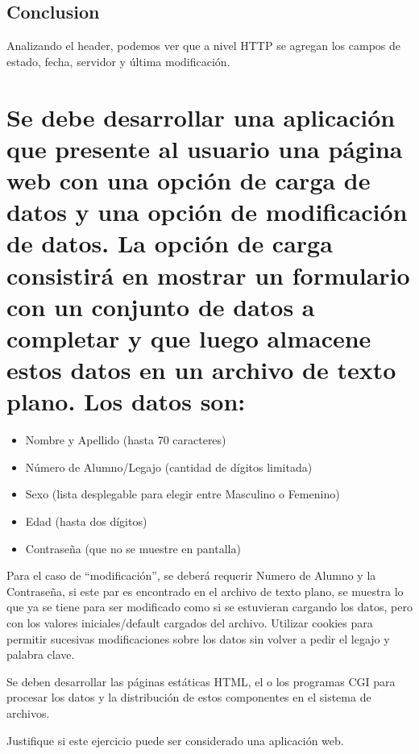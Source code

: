 \documentclass[12pt]{extarticle}
\begin{document}
    \subsection{Conclusion}\label{conclusion}

Analizando el header, podemos ver que a nivel HTTP se agregan los campos
de estado, fecha, servidor y última modificación.

    \section{Se debe desarrollar una aplicación que presente al usuario una
página web con una opción de carga de datos y una opción de modificación
de datos. La opción de carga consistirá en mostrar un formulario con un
conjunto de datos a completar y que luego almacene estos datos en un
archivo de texto plano. Los datos
son:}\label{se-debe-desarrollar-una-aplicaciuxf3n-que-presente-al-usuario-una-puxe1gina-web-con-una-opciuxf3n-de-carga-de-datos-y-una-opciuxf3n-de-modificaciuxf3n-de-datos.-la-opciuxf3n-de-carga-consistiruxe1-en-mostrar-un-formulario-con-un-conjunto-de-datos-a-completar-y-que-luego-almacene-estos-datos-en-un-archivo-de-texto-plano.-los-datos-son}

\begin{itemize}
\item
  Nombre y Apellido (hasta 70 caracteres)
\item
  Número de Alumno/Legajo (cantidad de dígitos limitada)
\item
  Sexo (lista desplegable para elegir entre Masculino o Femenino)
\item
  Edad (hasta dos dígitos)
\item
  Contraseña (que no se muestre en pantalla)
\end{itemize}

Para el caso de ``modificación'', se deberá requerir Numero de Alumno y
la Contraseña, si este par es encontrado en el archivo de texto plano,
se muestra lo que ya se tiene para ser modificado como si se estuvieran
cargando los datos, pero con los valores iniciales/default cargados del
archivo. Utilizar cookies para permitir sucesivas modificaciones sobre
los datos sin volver a pedir el legajo y palabra clave.

Se deben desarrollar las páginas estáticas HTML, el o los programas CGI
para procesar los datos y la distribución de estos componentes en el
sistema de archivos.

Justifique si este ejercicio puede ser considerado una aplicación web.
\end{document}
